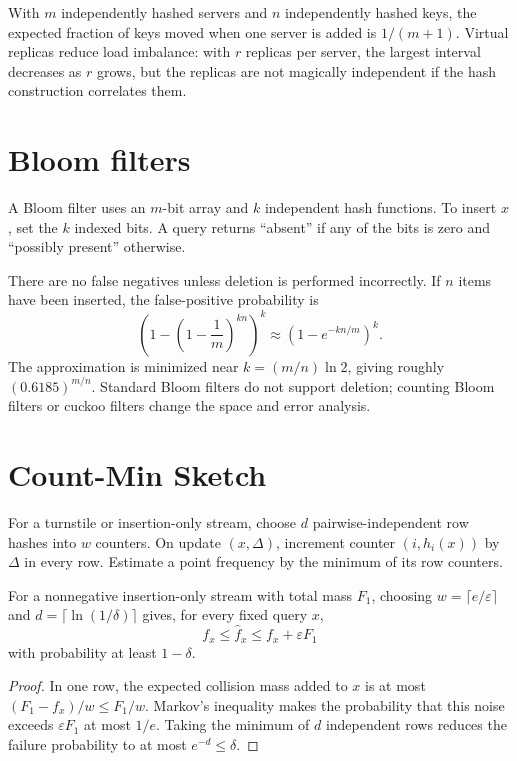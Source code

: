 With $m$ independently hashed servers and $n$ independently hashed keys, the
expected fraction of keys moved when one server is added is $1/(m+1)$.
Virtual replicas reduce load imbalance: with $r$ replicas per server, the
largest interval decreases as $r$ grows, but the replicas are not magically
independent if the hash construction correlates them.

\section{Bloom filters}

A Bloom filter uses an $m$-bit array and $k$ independent hash functions.  To
insert $x$, set the $k$ indexed bits.  A query returns ``absent'' if any of
the bits is zero and ``possibly present'' otherwise.

There are no false negatives unless deletion is performed incorrectly.  If
$n$ items have been inserted, the false-positive probability is
\[
 \left(1-\left(1-\frac1m\right)^{kn}\right)^k
 \approx (1-e^{-kn/m})^k.
\]
The approximation is minimized near $k=(m/n)\ln 2$, giving roughly
$(0.6185)^{m/n}$.  Standard Bloom filters do not support deletion; counting
Bloom filters or cuckoo filters change the space and error analysis.

\section{Count-Min Sketch}

For a turnstile or insertion-only stream, choose $d$ pairwise-independent
row hashes into $w$ counters.  On update $(x,\Delta)$, increment counter
$(i,h_i(x))$ by $\Delta$ in every row.  Estimate a point frequency by the
minimum of its row counters.

\begin{theorem}
For a nonnegative insertion-only stream with total mass $F_1$, choosing
$w=\lceil e/\varepsilon\rceil$ and
$d=\lceil\ln(1/\delta)\rceil$ gives, for every fixed query $x$,
\[
 f_x\leq\widehat f_x\leq f_x+\varepsilon F_1
\]
with probability at least $1-\delta$.
\end{theorem}

\begin{proof}
In one row, the expected collision mass added to $x$ is at most
$(F_1-f_x)/w\leq F_1/w$.  Markov's inequality makes the probability that
this noise exceeds $\varepsilon F_1$ at most $1/e$.  Taking the minimum of
$d$ independent rows reduces the failure probability to at most
$e^{-d}\leq\delta$.
\end{proof}

